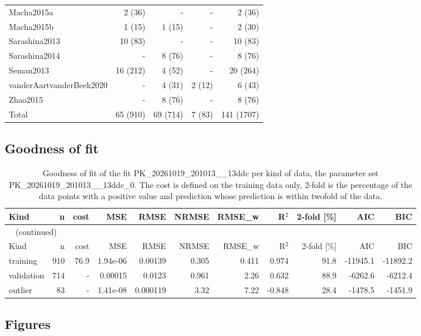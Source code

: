 \begin{longtable}{lrrrr}
Macha2015a & 2 (36) & - & - & 2 (36) \\
Macha2015b & 1 (15) & 1 (15) & - & 2 (30) \\
Sarashina2013 & 10 (83) & - & - & 10 (83) \\
Sarashina2014 & - & 8 (76) & - & 8 (76) \\
Seman2013 & 16 (212) & 4 (52) & - & 20 (264) \\
vanderAartvanderBeek2020 & - & 4 (31) & 2 (12) & 6 (43) \\
Zhao2015 & - & 8 (76) & - & 8 (76) \\
Total & 65 (910) & 69 (714) & 7 (83) & 141 (1707) \\
\end{longtable}

\subsection{Goodness of fit}

\begin{longtable}{lrrrrrrrrrr}
\caption{Goodness of fit of the fit PK\_20261019\_201013\_\_13ddc per kind of data, the parameter set PK\_20261019\_201013\_\_13ddc\_0. The cost is defined on the training data only, 2-fold is the percentage of the data points with a positive value and prediction whose prediction is within twofold of the data.}\label{tab:metrics:PK_20261019_201013__13ddc} \\
\toprule
Kind & n & cost & MSE & RMSE & NRMSE & RMSE\_w & R\ensuremath{^{2}} & 2-fold [\%] & AIC & BIC \\
\midrule
\endfirsthead
\multicolumn{11}{l}{\small\tablename~\thetable{} (continued)} \\
\toprule
Kind & n & cost & MSE & RMSE & NRMSE & RMSE\_w & R\ensuremath{^{2}} & 2-fold [\%] & AIC & BIC \\
\midrule
\endhead
\bottomrule
\endlastfoot
training & 910 & 76.9 & 1.94e-06 & 0.00139 & 0.305 & 0.411 & 0.974 & 91.8 & -11945.1 & -11892.2 \\
validation & 714 & - & 0.00015 & 0.0123 & 0.961 & 2.26 & 0.632 & 88.9 & -6262.6 & -6212.4 \\
outlier & 83 & - & 1.41e-08 & 0.000119 & 3.32 & 7.22 & -0.848 & 28.4 & -1478.5 & -1451.9 \\
\end{longtable}

\subsection{Figures}

